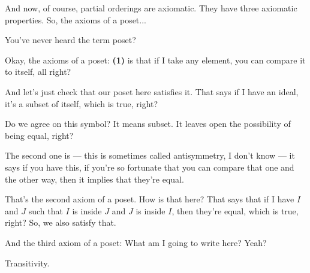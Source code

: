 \begin{speech}[00:29:58 - 00:31:18]
And now, of course, partial orderings are axiomatic. They have three axiomatic properties. So, the axioms of a poset... 

You've never heard the term poset? 

Okay, the axioms of a poset: \textbf{(1)} is that if I take any element, you can compare it to itself, all right? 

And let's just check that our poset here satisfies it. That says if I have an ideal, it's a subset of itself, which is true, right? 

Do we agree on this symbol?  It means subset. It leaves open the possibility of being equal, right?

The second one is --- this is sometimes called antisymmetry, I don't know --- it says if you have this, if you're so fortunate that you can compare that one and the other way, then it implies that they're equal. 

That's the second axiom of a poset. How is that here? That says that if I have $I$ and $J$ such that $I$ is inside $J$ and $J$ is inside $I$, then they're equal, which is true, right?  So, we also satisfy that.
\end{speech}

\begin{speech}[00:31:18 - 00:31:22]
And the third axiom of a poset: What am I going to write here? Yeah?
\end{speech}

\begin{student}
Transitivity.
\end{student}

